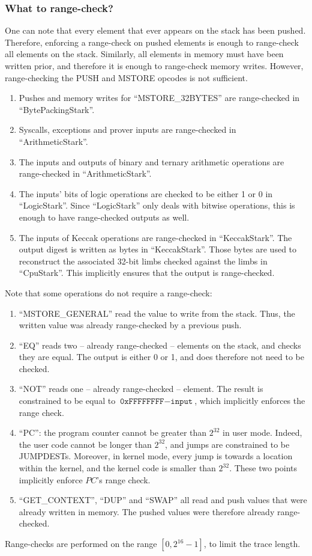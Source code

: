 \subsubsection{What to range-check?}
One can note that every element that ever appears on the stack has been pushed. Therefore, enforcing a range-check on pushed elements is enough to range-check all elements on the stack. Similarly, all elements in memory must have been written prior, and therefore it is enough to range-check memory writes. However, range-checking the PUSH and MSTORE opcodes is not sufficient.
\begin{enumerate}
  \item Pushes and memory writes for ``MSTORE\_32BYTES'' are range-checked in ``BytePackingStark''.
  \item Syscalls, exceptions and prover inputs are range-checked in ``ArithmeticStark''.
  \item The inputs and outputs of binary and ternary arithmetic operations are range-checked in ``ArithmeticStark''.
  \item The inputs' bits of logic operations are checked to be either 1 or 0 in ``LogicStark''. Since ``LogicStark'' only deals with bitwise operations, this is enough to have range-checked outputs as well.
  \item The inputs of Keccak operations are range-checked in ``KeccakStark''. The output digest is written as bytes in ``KeccakStark''. Those bytes are used to reconstruct the associated 32-bit limbs checked against the limbs in ``CpuStark''. This implicitly ensures that the output is range-checked.
\end{enumerate}
Note that some operations do not require a range-check:
\begin{enumerate}
  \item ``MSTORE\_GENERAL'' read the value to write from the stack. Thus, the written value was already range-checked by a previous push.
  \item ``EQ'' reads two -- already range-checked -- elements on the stack, and checks they are equal. The output is either 0 or 1, and does therefore not need to be checked.
  \item ``NOT'' reads one -- already range-checked -- element. The result is constrained to be equal to $\texttt{0xFFFFFFFF} - \texttt{input}$, which implicitly enforces the range check.
  \item ``PC'': the program counter cannot be greater than $2^{32}$ in user mode. Indeed, the user code cannot be longer than $2^{32}$, and jumps are constrained to be JUMPDESTs. Moreover, in kernel mode, every jump is towards a location within the kernel, and the kernel code is smaller than $2^{32}$. These two points implicitly enforce $PC$'s range check.
  \item ``GET\_CONTEXT'', ``DUP'' and ``SWAP'' all read and push values that were already written in memory. The pushed values were therefore already range-checked.
\end{enumerate}
Range-checks are performed on the range $[0, 2^{16} - 1]$, to limit the trace length.

